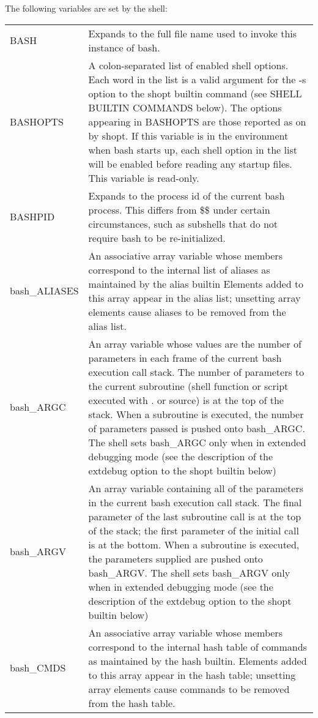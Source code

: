 \documentclass[11pt]{article}
\begin{document}
The following variables are set by the shell:
\begin{longtable}{p{}p{}}
BASH &
Expands to the full file name used to invoke this instance of bash. \\

BASHOPTS &
A colon-separated list of enabled shell options. Each word in the list is a valid argument for the -s option to the shopt builtin command (see SHELL BUILTIN COMMANDS below). The options appearing in BASHOPTS are those reported as on by shopt. If this variable is in the environment when bash starts up, each shell option in the list will be enabled before reading any startup files. This variable is read-only. \\

BASHPID &
Expands to the process id of the current bash process. This differs from \$\$ under certain circumstances, such as subshells that do not require bash to be re-initialized. \\

bash\_ALIASES &
An associative array variable whose members correspond to the internal list of aliases as maintained by the alias builtin Elements added to this array appear in the alias list; unsetting array elements cause aliases to be removed from the alias list. \\

bash\_ARGC &
An array variable whose values are the number of parameters in each frame of the current bash execution call stack. The number of parameters to the current subroutine (shell function or script executed with . or source) is at the top of the stack. When a subroutine is executed, the number of parameters passed is pushed onto bash\_ARGC. The shell sets bash\_ARGC only when in extended debugging mode (see the description of the extdebug option to the shopt builtin below) \\

bash\_ARGV &
An array variable containing all of the parameters in the current bash execution call stack. The final parameter of the last subroutine call is at the top of the stack; the first parameter of the initial call is at the bottom. When a subroutine is executed, the parameters supplied are pushed onto bash\_ARGV. The shell sets bash\_ARGV only when in extended debugging mode (see the description of the extdebug option to the shopt builtin below) \\

bash\_CMDS &
An associative array variable whose members correspond to the internal hash table of commands as maintained by the hash builtin. Elements added to this array appear in the hash table; unsetting array elements cause commands to be removed from the hash table. \\


\end{longtable}
\end{document}
